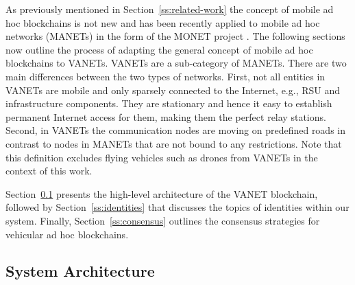 \documentclass{llncs}
\begin{document}
{		%
		
		As previously mentioned in Section~\ref{ss:related-work} the concept of mobile ad hoc blockchains is not new and has been recently applied to mobile ad hoc networks (MANETs) in the form of the MONET project \cite{monetWhitepaper}. The following sections now outline the process of adapting the general concept of mobile ad hoc blockchains to VANETs. VANETs are a sub-category of MANETs. There are two main differences between the two types of networks. First, not all entities in VANETs are mobile and only sparsely connected to the Internet, e.g., RSU and infrastructure components. They are stationary and hence it easy to establish permanent Internet access for them, making them the perfect relay stations. Second, in VANETs the communication nodes are moving on predefined roads in contrast to nodes in MANETs that are not bound to any restrictions. Note that this definition excludes flying vehicles such as drones from VANETs in the context of this work.  
		
		Section~\ref{ss:architecture-overview} presents the high-level architecture of the VANET blockchain, followed by Section~\ref{ss:identities} that discusses the topics of identities within our system. Finally, Section~\ref{ss:consensus} outlines the consensus strategies for vehicular ad hoc blockchains.
		
		
		\subsection{System Architecture}
			\label{ss:architecture-overview}
			
}
\end{document}

